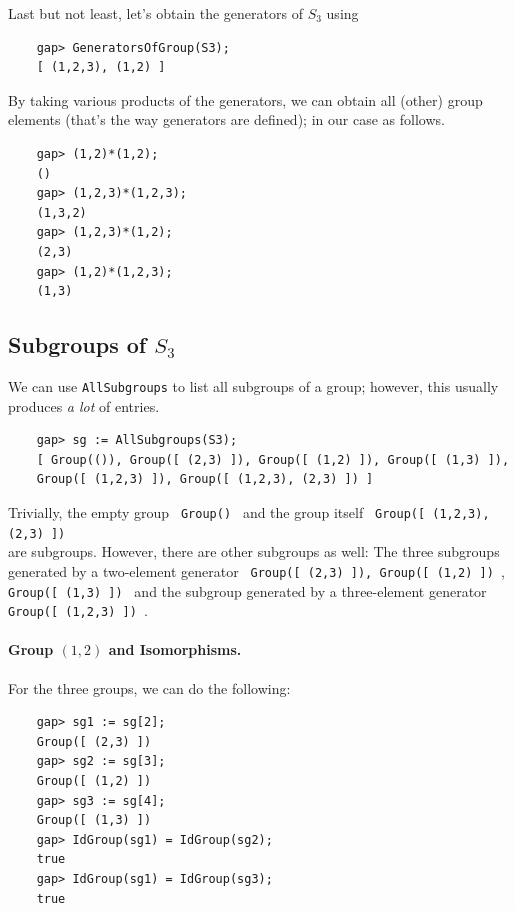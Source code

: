 Last but not least, let's obtain the generators of $S_3$ using

\begin{verbatim}
    gap> GeneratorsOfGroup(S3);
    [ (1,2,3), (1,2) ]
\end{verbatim}

By taking various products of the generators, we can obtain all (other) group elements (that's the way generators are defined); in our case as follows.

\begin{verbatim}
    gap> (1,2)*(1,2);
    ()
    gap> (1,2,3)*(1,2,3);
    (1,3,2)
    gap> (1,2,3)*(1,2);
    (2,3)
    gap> (1,2)*(1,2,3);
    (1,3)
\end{verbatim}


\subsection{Subgroups of $S_3$}

We can use \verb|AllSubgroups| to list all subgroups of a group; however, this usually produces \emph{a lot} of entries.

\begin{verbatim}
    gap> sg := AllSubgroups(S3);
    [ Group(()), Group([ (2,3) ]), Group([ (1,2) ]), Group([ (1,3) ]), 
    Group([ (1,2,3) ]), Group([ (1,2,3), (2,3) ]) ]
\end{verbatim}

Trivially, the empty group \verb+ Group() + and the group itself \verb+ Group([ (1,2,3), (2,3) ]) + \\ are subgroups. However, there are other subgroups as well: The three subgroups generated by a two-element generator 
\verb+ Group([ (2,3) ]), Group([ (1,2) ]) +,\\
\verb+Group([ (1,3) ]) + and the subgroup generated by a three-element generator \\ \verb+Group([ (1,2,3) ]) +.

\paragraph{Group $(1,2)$ and Isomorphisms.} For the three groups, we can do the following:

\begin{verbatim}
    gap> sg1 := sg[2];
    Group([ (2,3) ])
    gap> sg2 := sg[3];
    Group([ (1,2) ])
    gap> sg3 := sg[4];
    Group([ (1,3) ])
    gap> IdGroup(sg1) = IdGroup(sg2);
    true
    gap> IdGroup(sg1) = IdGroup(sg3);
    true
\end{verbatim}

